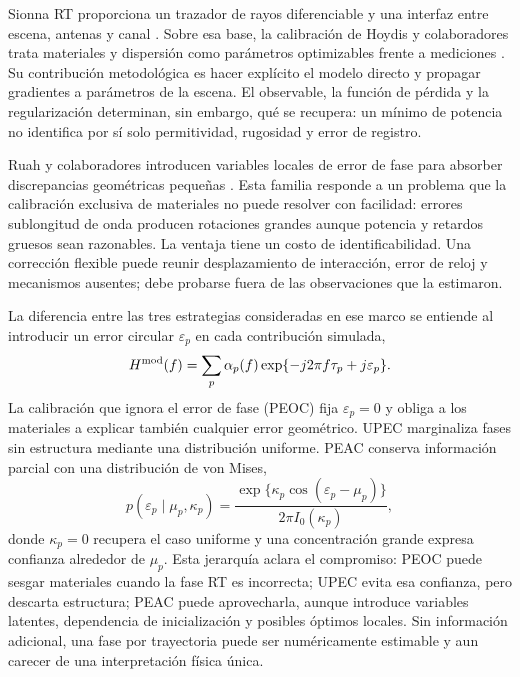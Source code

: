 Sionna RT proporciona un trazador de rayos diferenciable y una interfaz entre escena,
antenas y canal \citep{Hoydis2023SionnaRT}. Sobre esa base, la calibración de Hoydis
y colaboradores trata materiales y dispersión como parámetros optimizables frente a
mediciones \citep{Hoydis2024DiffRT}. Su contribución metodológica es hacer explícito
el modelo directo y propagar gradientes a parámetros de la escena. El observable,
la función de pérdida y la regularización determinan, sin embargo, qué se recupera:
un mínimo de potencia no identifica por sí solo permitividad, rugosidad y error de
registro.

Ruah y colaboradores introducen variables locales de error de fase para absorber
discrepancias geométricas pequeñas \citep{Ruah2024Phase}. Esta familia responde a
un problema que la calibración exclusiva de materiales no puede resolver con
facilidad: errores sublongitud de onda producen rotaciones grandes aunque potencia
y retardos gruesos sean razonables. La ventaja tiene un costo de identificabilidad.
Una corrección flexible puede reunir desplazamiento de interacción, error de reloj
y mecanismos ausentes; debe probarse fuera de las observaciones que la estimaron.

La diferencia entre las tres estrategias consideradas en ese marco se entiende al
introducir un error circular $\varepsilon_p$ en cada contribución simulada,
\begin{equation}
H^{\rm mod}(f)=\sum_p \alpha_p(f)
\exp\{-j2\pi f\tau_p+j\varepsilon_p\}.
\label{eq:path_phase_error_model}
\end{equation}
La calibración que ignora el error de fase (PEOC) fija
$\varepsilon_p=0$ y obliga a los materiales a explicar también cualquier error
geométrico. UPEC marginaliza fases sin estructura mediante una distribución
uniforme. PEAC conserva información parcial con una distribución de von Mises,
\begin{equation}
p(\varepsilon_p\mid\mu_p,\kappa_p)=
\frac{\exp\{\kappa_p\cos(\varepsilon_p-\mu_p)\}}
{2\pi I_0(\kappa_p)},
\label{eq:von_mises_path_error}
\end{equation}
donde $\kappa_p=0$ recupera el caso uniforme y una concentración grande expresa
confianza alrededor de $\mu_p$. Esta jerarquía aclara el compromiso: PEOC puede
sesgar materiales cuando la fase RT es incorrecta; UPEC evita esa confianza, pero
descarta estructura; PEAC puede aprovecharla, aunque introduce variables latentes,
dependencia de inicialización y posibles óptimos locales. Sin información adicional,
una fase por trayectoria puede ser numéricamente estimable y aun carecer de una
interpretación física única.

